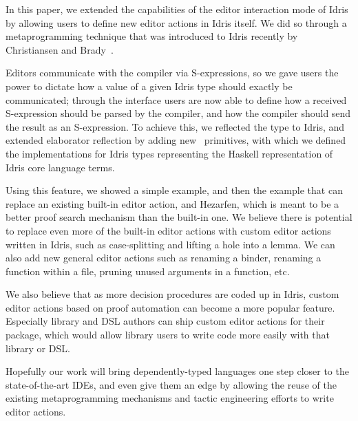 In this paper, we extended the capabilities of the editor interaction mode of
Idris by allowing users to define new editor actions in Idris itself. We did
so through a metaprogramming technique that was introduced to Idris recently by
Christiansen and Brady~\cite{elabref}.

Editors communicate with the compiler via S-expressions, so we gave users the
power to dictate how a value of a given Idris type should exactly be
communicated; through the  interface users are now able to
define how a received S-expression should be parsed by the compiler, and how
the compiler should send the result as an S-expression. To achieve this, we
reflected the  type to Idris, and extended elaborator reflection
by adding new \Elab\ primitives, with which we defined the 
implementations for Idris types representing the Haskell representation of
Idris core language terms.

Using this feature, we showed a simple  example, and then the
 example that can replace an existing built-in editor action,
and Hezarfen, which is meant to be a better proof search mechanism than the
built-in one. We believe there is potential to replace even more of the
built-in editor actions with custom editor actions written in Idris, such as
case-splitting and lifting a hole into a lemma. We can also add new general
editor actions such as renaming a binder, renaming a function within a file,
pruning unused arguments in a function, etc.

We also believe that as more decision procedures are coded up in Idris,
custom editor actions based on proof automation can become a more popular
feature. Especially library and DSL authors can ship custom editor actions for
their package, which would allow library users to write code more easily with
that library or DSL.

Hopefully our work will bring dependently-typed languages one step closer to the
state-of-the-art IDEs, and even give them an edge by allowing the reuse of the
existing metaprogramming mechanisms and tactic engineering efforts to write
editor actions.

